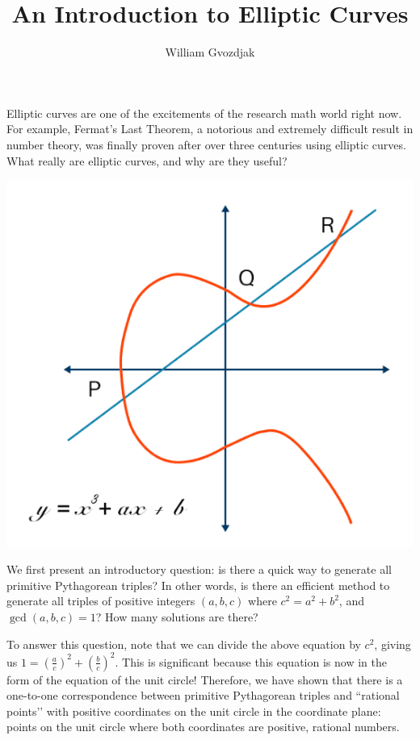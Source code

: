 \documentclass{article}
\title{An Introduction to Elliptic Curves}
\author{William Gvozdjak}
\begin{document}
\maketitle
Elliptic curves are one of the excitements of the research math world right now. For example, Fermat’s Last Theorem, a notorious and extremely difficult result in number theory, was finally proven after over three centuries using elliptic curves. What really are elliptic curves, and why are they useful?
\begin{center}
\includegraphics[scale=0.8]{images/curve3.png}
\end{center}
We first present an introductory question: is there a quick way to generate all primitive Pythagorean triples? In other words, is there an efficient method to generate all triples of positive integers $(a, b, c)$ where $c^2=a^2+b^2$, and $\gcd(a, b, c)=1$? How many solutions are there?

To answer this question, note that we can divide the above equation by $c^2$, giving us $1=\left(\frac{a}{c}\right)^2+\left(\frac{b}{c}\right)^2$. This is significant because this equation is now in the form of the equation of the unit circle! Therefore, we have shown that there is a one-to-one correspondence between primitive Pythagorean triples and ``rational points’’ with positive coordinates on the unit circle in the coordinate plane: points on the unit circle where both coordinates are positive, rational numbers.
\end{document}
